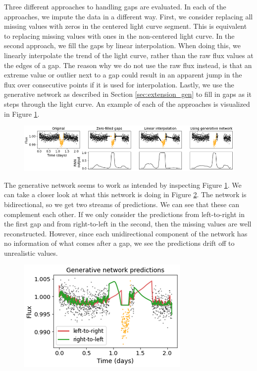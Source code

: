 Three different approaches to handling gaps are evaluated. In each of the approaches, we impute the data in a different way. First, we consider replacing all missing values with zeros in the centered light curve segment. This is equivalent to replacing missing values with ones in the non-centered light curve. In the second approach, we fill the gaps by linear interpolation. When doing this, we linearly interpolate the trend of the light curve, rather than the raw flux values at the edges of a gap. The reason why we do not use the raw flux instead, is that an extreme value or outlier next to a gap could result in an apparent jump in the flux over consecutive points if it is used for interpolation. Lastly, we use the generative network as described in Section \ref{sec:extension_gen} to fill in gaps as it steps through the light curve. An example of each of the approaches is visualized in Figure \ref{fig:preprocessing-gap_examples}. 

\begin{figure}
    \centering
    \includegraphics[width=0.8\linewidth]{Experiments/Figures/Preprocessing/gaps_example.png}
    \caption{}
    \label{fig:preprocessing-gap_examples}
\end{figure}

The generative network seems to work as intended by inspecting Figure \ref{fig:preprocessing-gap_examples}. We can take a closer look at what this network is doing in Figure \ref{fig:preprocessing-generative_example}. The network is bidirectional, so we get two streams of predictions. We can see that these can complement each other. If we only consider the predictions from left-to-right in the first gap and from right-to-left in the second, then the missing values are well reconstructed. However, since each unidirectional component of the network has no information of what comes after a gap, we see the predictions drift off to unrealistic values.

\begin{figure}
    \centering
    \includegraphics[width=0.34\linewidth]{Experiments/Figures/Preprocessing/generative_example.png}
    \caption{}
    \label{fig:preprocessing-generative_example}
\end{figure}

